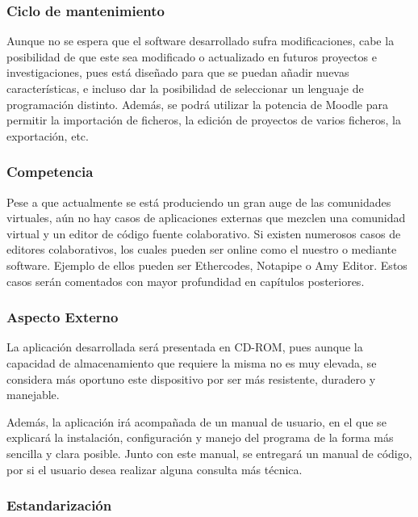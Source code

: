 \subsubsection{Ciclo de mantenimiento}

Aunque no se espera que el software desarrollado sufra modificaciones, cabe la posibilidad de que este sea modificado o actualizado en futuros proyectos e investigaciones, pues está diseñado para que se puedan añadir nuevas características, e incluso dar la posibilidad de seleccionar un lenguaje de programación distinto. Además, se podrá utilizar la potencia de Moodle para permitir la importación de ficheros, la edición de proyectos de varios ficheros, la exportación, etc.

\subsubsection{Competencia}

Pese a que actualmente se está produciendo un gran auge de las comunidades virtuales, aún no hay casos de aplicaciones externas que mezclen una comunidad virtual y un editor de código fuente colaborativo. Si existen numerosos casos de editores colaborativos, los cuales pueden ser online como el nuestro o mediante software. Ejemplo de ellos pueden ser Ethercodes\cite{ethercodes}, Notapipe\cite{notapipe} o Amy Editor\cite{amyeditor}. Estos casos serán comentados con mayor profundidad en capítulos posteriores.

\subsubsection{Aspecto Externo}

La aplicación desarrollada será presentada en CD-ROM, pues aunque la capacidad de almacenamiento que requiere la misma no es muy elevada, se considera más oportuno este dispositivo por ser más resistente, duradero y manejable.

Además, la aplicación irá acompañada de un manual de usuario, en el que se explicará la instalación, configuración y manejo del programa de la forma más sencilla y clara posible. Junto con este manual, se entregará un manual de código, por si el usuario desea realizar alguna consulta más técnica.

\subsubsection{Estandarización}

